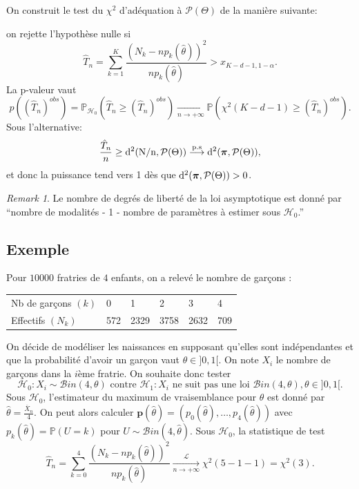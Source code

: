 \documentclass[
]{book}
\theoremstyle{definition}
\theoremstyle{definition}
\theoremstyle{definition}
\theoremstyle{definition}
\theoremstyle{remark}
\newtheorem*{remark}{Remark}
\begin{document}
On construit le test du \(\chi^2\) d'adéquation à \({\mathcal P}(\Theta)\) de
la manière suivante:

on rejette l'hypothèse nulle si\\
\[\hat T_n= \sum_{k=1}^K \frac{\left(N_k - n p_k(\hat\theta)\right)^2}{n p_k(\hat\theta)} > x_{K-d-1,1-\alpha}.\]
La p-valeur vaut
\[
p( (\hat T_n)^{obs}) = \mathbb{P}_{\mathcal{H}_0}(\hat T_n \geq  (\hat T_n)^{obs}) \underset{n \rightarrow +\infty}{\longrightarrow}    \mathbb{P}( \chi^2(K-d-1) \geq  (\hat T_n)^{obs}). 
\]
Sous l'alternative:\\
\[
\frac{\hat T_n}{n} \geq \rm{d}^2( N/n, {\mathcal P}(\Theta)) \stackrel{p.s}{\longrightarrow} \rm{d}^2 (\boldsymbol{\pi}, {\mathcal P}(\Theta)),
\]
et donc la puissance tend vers 1 dès que
\(\rm{d}^2(\boldsymbol{\pi},{\mathcal P}(\Theta))>0\).

\begin{remark}

Le nombre de degrés de liberté de la loi asymptotique est donné par ``nombre de modalités - 1 - nombre de paramètres à estimer sous \(\mathcal{H}_0\).''

\end{remark}

\hypertarget{exemple}{%
\subsection{Exemple}\label{exemple}}

Pour \(10000\) fratries de \(4\) enfants, on a relevé le nombre de garçons :

\begin{longtable}[]{@{}llllll@{}}
\toprule
\endhead
Nb de garçons \((k)\) & 0 & 1 & 2 & 3 & 4\tabularnewline
Effectifs \((N_k)\) & 572 & 2329 & 3758 & 2632 & 709\tabularnewline
\bottomrule
\end{longtable}

On décide de modéliser les naissances en supposant qu'elles sont indépendantes et que la probabilité d'avoir un garçon vaut \(\theta\in]0,1[\).
On note \(X_i\) le nombre de garçons dans la \(i\)ème fratrie. On souhaite donc tester
\[
\mathcal{H}_0 : X_i \sim \mathcal Bin(4,\theta) \textrm{ contre } \mathcal{H}_1 : X_i \textrm{ ne suit pas une loi } \mathcal Bin(4,\theta), \theta\in]0,1[.
\]
Sous \(\mathcal{H}_0\), l'estimateur du maximum de vraisemblance pour \(\theta\) est donné par \(\hat \theta = \frac{\overline{X}_n}{4}\). On peut alors calculer \(\mathbf{p}(\hat\theta) = (p_0(\hat\theta),\ldots,p_4(\hat\theta))\) avec \(p_k(\hat\theta) = \mathbb{P}( U = k)\) pour \(U\sim \mathcal Bin(4,\hat\theta)\). Sous \(\mathcal{H}_0\), la statistique de test
\[
\hat T_n =  \sum_{k=0}^4 \frac{\left(N_k - n p_k(\hat\theta)\right)^2}{n p_k(\hat\theta)}  \underset{n\rightarrow +\infty}{\stackrel{\mathcal L}{\longrightarrow}}\chi^2(5-1-1) =\chi^2(3).
\]
\end{document}
